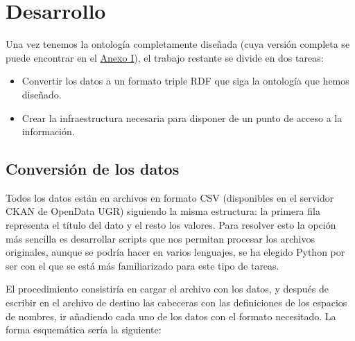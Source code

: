 \chapter{Desarrollo}

Una vez tenemos la ontología completamente diseñada (cuya versión completa se puede encontrar en el \hyperref[anexo_i]{Anexo I}), el trabajo restante se divide en dos tareas:

\begin{itemize}
	\item Convertir los datos a un formato triple {\sf RDF} que siga la ontología que hemos diseñado.
	\item Crear la infraestructura necesaria para disponer de un punto de acceso a la información.
\end{itemize}

\section{Conversión de los datos}

Todos los datos están en archivos en formato {\sf CSV} (disponibles en el servidor C{\sf KAN} de {\sf OpenData UGR}) siguiendo la misma estructura: la primera fila representa el título del dato y el resto los valores. Para resolver esto la opción más sencilla es desarrollar scripts que nos permitan procesar los archivos originales, aunque se podría hacer en varios lenguajes, se ha elegido {\sf Python} por ser con el que se está más familiarizado para este tipo de tareas.

\bigskip
El procedimiento consistiría en cargar el archivo con los datos, y después de escribir en el archivo de destino las cabeceras con las definiciones de los espacios de nombres, ir añadiendo cada uno de los datos con el formato necesitado. La forma esquemática sería la siguiente: 

